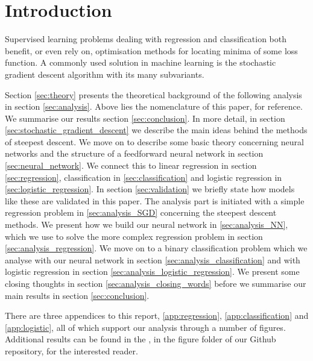 \section{Introduction}\label{sec:introduction}


Supervised learning problems dealing with regression and classification both benefit, or even rely on, optimisation methods for locating minima of some loss function. A commonly used solution in machine learning is the stochastic gradient descent algorithm with its many subvariants. 


\fillertext


Section \ref{sec:theory} presents the theoretical background of the following analysis in section \ref{sec:analysis}. Above lies the nomenclature of this paper, for reference. We summarise our results section \ref{sec:conclusion}. In more detail, in section \ref{sec:stochastic_gradient_descent} we describe the main ideas behind the methods of steepest descent. We move on to describe some basic theory concerning neural networks and the structure of a feedforward neural network in section \ref{sec:neural_network}. We connect this to linear regression in section \ref{sec:regression}, classification in \ref{sec:classification} and logistic regression in \ref{sec:logistic_regression}. In section \ref{sec:validation} we briefly state how models like these are validated in this paper. The analysis part is initiated with a simple regression problem in \ref{sec:analysis_SGD} concerning the steepest descent methods. We present how we build our neural network in \ref{sec:analysis_NN}, which we use to solve the more complex regression problem in section \ref{sec:analysis_regression}. We move on to a binary classification problem which we analyse with our neural network in section \ref{sec:analysis_classification} and with logistic regression in section \ref{sec:analysis_logistic_regression}. We present some closing thoughts  in section \ref{sec:analysis_closing_words} before we summarise our main results in section \ref{sec:conclusion}.

There are three appendices to this report, \ref{app:regression}, \ref{app:classification} and \ref{app:logistic}, all of which support our analysis through a number of figures. Additional results can be found in the \figureslink, in the figure folder of our Github repository, for the interested reader.
